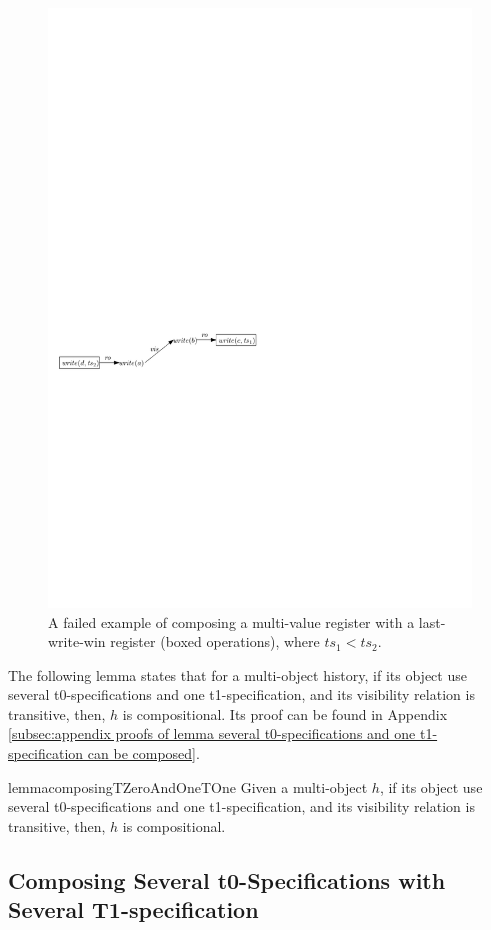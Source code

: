 \begin{figure}[t]
  \centering
  \includegraphics[width=0.6 \textwidth]{figures/MVReg-LWWReg-Nocd.pdf}
\vspace{-10pt}
  \caption{A failed example of composing a multi-value register with a last-write-win register (boxed operations), where $\mathit{ts}_1 < \mathit{ts}_2$.}
  \label{fig:a failed example of composing a multi-value register with a last-write-win register}
\end{figure}

The following lemma states that for a multi-object history, if its object use several t0-specifications and one t1-specification, and its visibility relation is transitive, then, $h$ is compositional. Its proof can be found in Appendix \ref{subsec:appendix proofs of lemma several t0-specifications and one t1-specification can be composed}.

\begin{restatable}{lemma}{composingTZeroAndOneTOne}
\label{lemma:several t0-specifications and one t1-specification can be composed}
Given a multi-object $h$, if its object use several t0-specifications and one t1-specification, and its visibility relation is transitive, then, $h$ is compositional.
\end{restatable} 




\subsection{Composing Several t0-Specifications with Several T1-specification}
\label{lemma:composing several t0-specification with several t1-specification}

